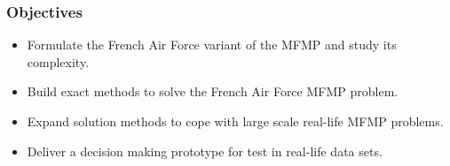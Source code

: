 \begin{frame}
\frametitle{\textbf{Objectives}}
  \begin{itemize}[<+->]
  \item 
    Formulate the French Air Force variant of the MFMP and study its complexity.
  \item
    Build exact methods to solve the French Air Force MFMP problem.
  \item
    Expand solution methods to cope with large scale real-life MFMP problems.
  \item
    Deliver a decision making prototype for test in real-life data sets.
  \end{itemize}
\end{frame}
 

  












